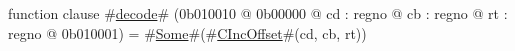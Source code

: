 function clause #\hyperref[zdecode]{decode}# (0b010010 @ 0b00000 @ cd : regno @ cb : regno @ rt : regno @ 0b010001) = #\hyperref[zSome]{Some}#(#\hyperref[zCIncOffset]{CIncOffset}#(cd, cb, rt))
